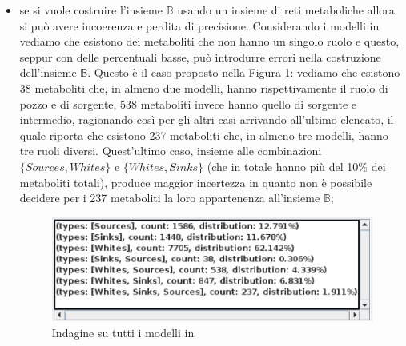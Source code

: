 \begin{itemize}
\item se si vuole costruire l'insieme $\mathbb{B}$ usando un insieme
  di reti metaboliche allora si pu\`o avere incoerenza e perdita di
  precisione. Considerando i modelli in \cite{MetExplore} vediamo che
  esistono dei metaboliti che non hanno un singolo ruolo e questo,
  seppur con delle percentuali basse, pu\`o introdurre errori nella
  costruzione dell'insieme $\mathbb{B}$. Questo \`e il caso proposto
  nella Figura \ref{fig:ResultViewer-MetExplore-models}: vediamo che
  esistono 38 metaboliti che, in almeno due modelli, hanno
  rispettivamente il ruolo di pozzo e di sorgente, 538 metaboliti
  invece hanno quello di sorgente e intermedio, ragionando cos\`i per
  gli altri casi arrivando all'ultimo elencato, il quale riporta che
  esistono 237 metaboliti che, in almeno tre modelli, hanno tre ruoli
  diversi. Quest'ultimo caso, insieme alle combinazioni $\{Sources,
  Whites\}$ e $\{Whites, Sinks\}$ (che in totale hanno pi\`u del 10\%
  dei metaboliti totali), produce maggior incertezza in quanto non \`e
  possibile decidere per i 237 metaboliti la loro appartenenza
  all'insieme $\mathbb{B}$;
  \begin{figure}
    \centering
    \includegraphics[scale=.7]{images/ResultViewer-grouping-table-zoom}
    \caption{Indagine su tutti i modelli in \cite{MetExplore}}
    \label{fig:ResultViewer-MetExplore-models}
  \end{figure}


\end{itemize}

